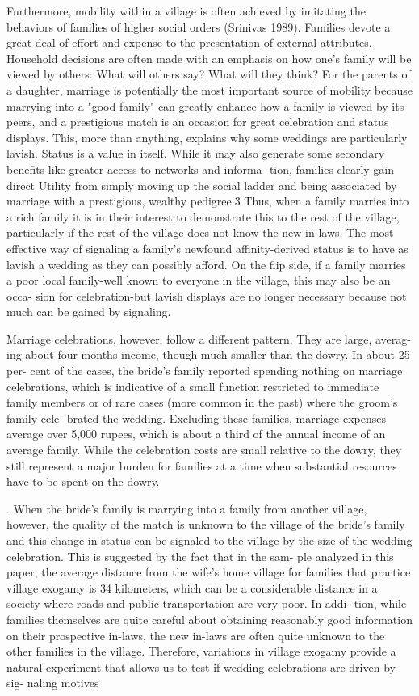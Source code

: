 \documentclass[a4paper, 11pt, onecolumn]{article}
\begin{document}
Furthermore, mobility within a village is often achieved by imitating the behaviors
of families of higher social orders (Srinivas 1989). Families devote a great deal of
effort and expense to the presentation of external attributes. Household decisions are
often made with an emphasis on how one's family will be viewed by others: What will
others say? What will they think? For the parents of a daughter, marriage is potentially
the most important source of mobility because marrying into a "good family" can
greatly enhance how a family is viewed by its peers, and a prestigious match is an
occasion for great celebration and status displays. This, more than anything, explains
why some weddings are particularly lavish. Status is a value in itself.
While it may
also generate some secondary benefits like greater access to networks and informa-
tion, families clearly gain direct Utility from simply moving up the social ladder and
being associated by marriage with a prestigious, wealthy pedigree.3 Thus, when a
family marries into a rich family it is in their interest to demonstrate this to the rest of
the village, particularly if the rest of the village does not know the new in-laws. The
most effective way of signaling a family's newfound affinity-derived status is to have
as lavish a wedding as they can possibly afford. On the flip side, if a family marries a
poor local family-well
known to everyone in the village, this may also be an occa-
sion for celebration-but lavish displays are no longer necessary because not much
can be gained by signaling.

Marriage celebrations, however, follow a different pattern. They are large, averag-
ing about four months income, though much smaller than the dowry. In about 25 per-
cent of the cases, the bride's family reported spending nothing on marriage
celebrations, which is indicative of a small function restricted to immediate family
members or of rare cases (more common in the past) where the groom's family cele-
brated the wedding. Excluding these families, marriage expenses average over 5,000
rupees, which is about a third of the annual income of an average family. While the
celebration costs are small relative to the dowry, they still represent a major burden
for families at a time when substantial resources have to be spent on the dowry.

. When the bride's family is marrying into
a family from another village, however, the quality of the match is unknown to the
village of the bride's family and this change in status can be signaled to the village
by the size of the wedding celebration. This is suggested by the fact that in the sam-
ple analyzed in this paper, the average distance from the wife's home village for
families that practice village exogamy is 34 kilometers, which can be a considerable
distance in a society where roads and public transportation are very poor. In addi-
tion, while families themselves are quite careful about obtaining reasonably good
information on their prospective in-laws, the new in-laws are often quite unknown
to the other families in the village. Therefore, variations in village exogamy provide
a natural experiment that allows us to test if wedding celebrations are driven by sig-
naling motives
\end{document}
